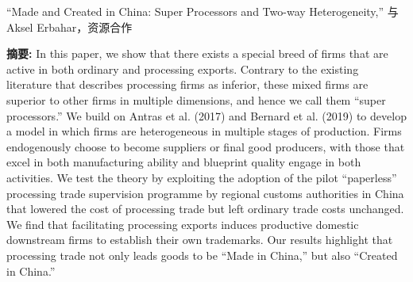 \documentclass[letterpaper]{article}
\begin{document}
{ “Made and Created in China: Super Processors and Two-way Heterogeneity,” 与Aksel Erbahar，资源合作
   \vspace{0.05in}
 \begin{center}
 \begin{minipage}{0.9\linewidth}
   \textbf{摘要:} In this paper, we show that there exists a special breed of firms that are active in both ordinary and processing exports. Contrary to the existing literature that describes processing firms as inferior, these mixed firms are superior to other firms in multiple dimensions, and hence we call them “super processors.” We build on Antras et al. (2017) and Bernard et al. (2019) to develop a model in which firms are heterogeneous in multiple stages of production. Firms endogenously choose to become suppliers or final good producers, with those that excel in both manufacturing ability and blueprint quality engage in both activities. We test the theory by exploiting the adoption of the pilot “paperless” processing trade supervision programme by regional customs authorities in China that lowered the cost of processing trade but left ordinary trade costs unchanged. We find that facilitating processing exports induces productive domestic downstream firms to establish their own trademarks. Our results highlight that processing trade not only leads goods to be “Made in China,” but also “Created in China.”
 \end{minipage}
 \end{center}

}
\end{document}
